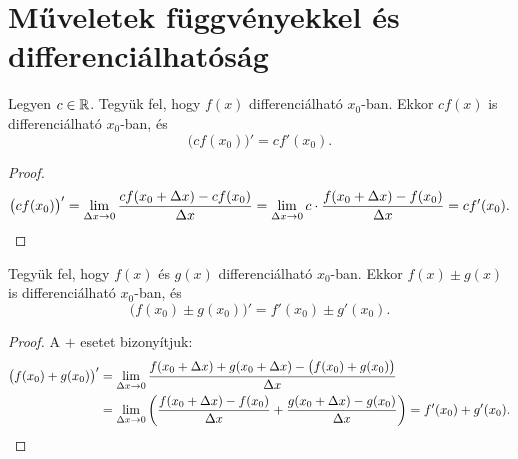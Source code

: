 \documentclass[11pt]{article}
\begin{document}
\section{Műveletek függvényekkel és differenciálhatóság}

\begin{thmbox}
\begin{theorem}[Konstansszoros]
Legyen $c\in\mathbb{R}$. Tegyük fel, hogy $f(x)$ differenciálható $x_{0}$-ban. Ekkor $cf(x)$ is differenciálható $x_{0}$-ban, és
\[
\bigl(cf(x_{0})\bigr)'=cf'(x_{0}).
\]
\end{theorem}
\end{thmbox}
\begin{proof}
\[
\bigl(cf(x_{0})\bigr)'=\lim_{\Delta x\to 0}\frac{cf(x_{0}+\Delta x)-cf(x_{0})}{\Delta x}
=\lim_{\Delta x\to 0}c\cdot\frac{f(x_{0}+\Delta x)-f(x_{0})}{\Delta x}=cf'(x_{0}). \qedhere
\]
\end{proof}

\begin{thmbox}
\begin{theorem}
Tegyük fel, hogy $f(x)$ és $g(x)$ differenciálható $x_{0}$-ban. Ekkor $f(x)\pm g(x)$ is differenciálható $x_{0}$-ban, és
\[
\bigl(f(x_{0})\pm g(x_{0})\bigr)'=f'(x_{0})\pm g'(x_{0}).
\]
\end{theorem}
\end{thmbox}
\begin{proof}
A $+$ esetet bizonyítjuk:
\begin{align*}
\bigl(f(x_{0})+g(x_{0})\bigr)'&=\lim_{\Delta x\to 0}\frac{f(x_{0}+\Delta x)+g(x_{0}+\Delta x)-\bigl(f(x_{0})+g(x_{0})\bigr)}{\Delta x}\\
&=\lim_{\Delta x\to 0}\left(\frac{f(x_{0}+\Delta x)-f(x_{0})}{\Delta x}+\frac{g(x_{0}+\Delta x)-g(x_{0})}{\Delta x}\right)=f'(x_{0})+g'(x_{0}). \qedhere
\end{align*}
\end{proof}
\end{document}
